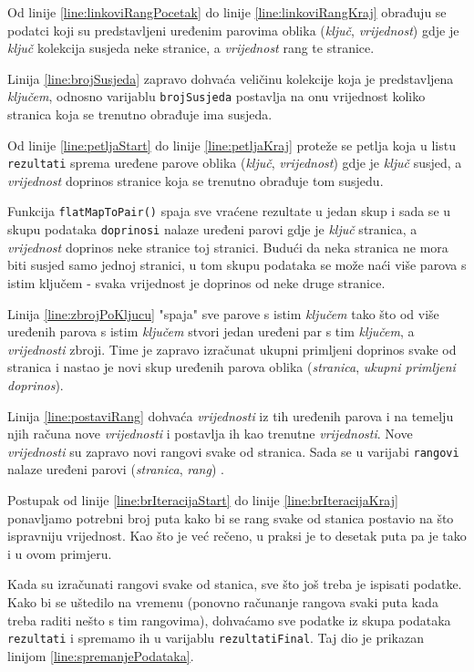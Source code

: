 \documentclass[times, utf8, zavrsni, numeric]{fer}
\begin{document}
Od linije \ref{line:linkoviRangPocetak} do linije \ref{line:linkoviRangKraj} obrađuju se podatci koji su predstavljeni uređenim parovima oblika (\emph{ključ}, \emph{vrijednost}) gdje je \emph{ključ} kolekcija susjeda neke stranice, a \emph{vrijednost} rang te stranice.

Linija \ref{line:brojSusjeda} zapravo dohvaća veličinu kolekcije koja je predstavljena \emph{ključem}, odnosno varijablu \texttt{brojSusjeda} postavlja na onu vrijednost koliko stranica koja se trenutno obrađuje ima susjeda. 

Od linije \ref{line:petljaStart} do linije \ref{line:petljaKraj} proteže se petlja koja u listu \texttt{rezultati} sprema uređene parove oblika (\emph{ključ}, \emph{vrijednost}) gdje je \emph{ključ} susjed, a \emph{vrijednost} doprinos stranice koja se trenutno obrađuje tom susjedu. 

Funkcija \texttt{flatMapToPair()} spaja sve vraćene rezultate u jedan skup i  sada se u skupu podataka \texttt{doprinosi} nalaze uređeni parovi gdje je \emph{ključ} stranica, a \emph{vrijednost} doprinos neke stranice toj stranici. Budući da neka stranica ne mora biti susjed samo jednoj stranici, u tom skupu podataka se može naći više parova s istim ključem - svaka vrijednost je doprinos od neke druge stranice. 

Linija \ref{line:zbrojPoKljucu} "spaja" sve parove s istim \emph{ključem} tako što od više uređenih parova s istim \emph{ključem} stvori jedan uređeni par s tim \emph{ključem}, a \emph{vrijednosti} zbroji. Time je zapravo izračunat ukupni primljeni doprinos svake od stranica i nastao je novi skup uređenih parova oblika (\emph{stranica}, \emph{ukupni primljeni doprinos}). 

Linija \ref{line:postaviRang} dohvaća \emph{vrijednosti} iz tih uređenih parova i na temelju njih računa nove \emph{vrijednosti} i postavlja ih kao trenutne \emph{vrijednosti}. Nove \emph{vrijednosti} su zapravo novi rangovi svake od stranica. Sada se u varijabi \texttt{rangovi} nalaze uređeni parovi (\emph{stranica}, \emph{rang}) . 

Postupak od linije \ref{line:brIteracijaStart} do linije \ref{line:brIteracijaKraj} ponavljamo potrebni broj puta kako bi se rang svake od stanica postavio na što ispravniju vrijednost. Kao što je već rečeno, u praksi je to desetak puta pa je tako i u ovom primjeru.

Kada su izračunati rangovi svake od stanica, sve što još treba je ispisati podatke. Kako bi se uštedilo na vremenu (ponovno računanje rangova svaki puta kada treba raditi nešto s tim rangovima), dohvaćamo sve podatke iz skupa podataka \texttt{rezultati} i spremamo ih u varijablu \texttt{rezultatiFinal}. Taj dio je prikazan linijom \ref{line:spremanjePodataka}.
\end{document}
